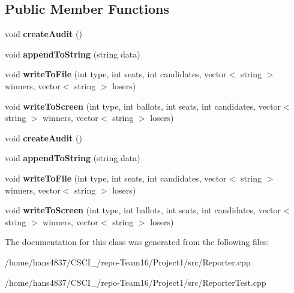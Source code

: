 \subsection*{Public Member Functions}
\begin{DoxyCompactItemize}
\item 
\mbox{\label{classReporter_a83f740722856a01617c46e05574681ae}} 
void {\bfseries create\+Audit} ()
\item 
\mbox{\label{classReporter_aa923dc71b57d43ac9c33159d5d250849}} 
void {\bfseries append\+To\+String} (string data)
\item 
\mbox{\label{classReporter_a4f98de86ab6d02bace97c8e101109dc1}} 
void {\bfseries write\+To\+File} (int type, int seats, int candidates, vector$<$ string $>$ winners, vector$<$ string $>$ losers)
\item 
\mbox{\label{classReporter_a47c43dfbd9e9319d35a64a4448584dd4}} 
void {\bfseries write\+To\+Screen} (int type, int ballots, int seats, int candidates, vector$<$ string $>$ winners, vector$<$ string $>$ losers)
\item 
\mbox{\label{classReporter_a83f740722856a01617c46e05574681ae}} 
void {\bfseries create\+Audit} ()
\item 
\mbox{\label{classReporter_aa923dc71b57d43ac9c33159d5d250849}} 
void {\bfseries append\+To\+String} (string data)
\item 
\mbox{\label{classReporter_a4f98de86ab6d02bace97c8e101109dc1}} 
void {\bfseries write\+To\+File} (int type, int seats, int candidates, vector$<$ string $>$ winners, vector$<$ string $>$ losers)
\item 
\mbox{\label{classReporter_a47c43dfbd9e9319d35a64a4448584dd4}} 
void {\bfseries write\+To\+Screen} (int type, int ballots, int seats, int candidates, vector$<$ string $>$ winners, vector$<$ string $>$ losers)
\end{DoxyCompactItemize}


The documentation for this class was generated from the following files\+:\begin{DoxyCompactItemize}
\item 
/home/hans4837/\+C\+S\+C\+I\+\_/repo-\/\+Team16/\+Project1/src/Reporter.\+cpp\item 
/home/hans4837/\+C\+S\+C\+I\+\_/repo-\/\+Team16/\+Project1/src/Reporter\+Test.\+cpp\end{DoxyCompactItemize}
